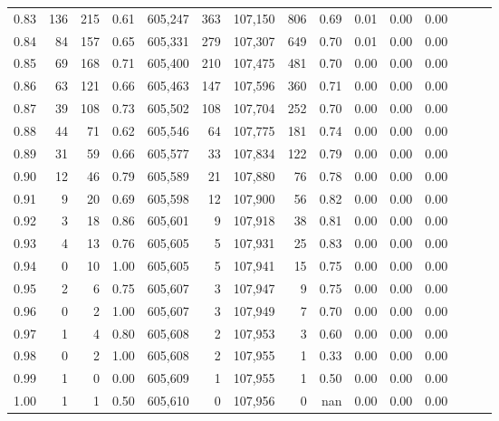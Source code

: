 \begin{tabular}{rrrrrrrrrrrrrrr}
0.83 &     136 &    215 &  0.61 &  605,247 &      363 &  107,150 &      806 &  0.69 &  0.01 &  0.00 &      0.00 \\
0.84 &      84 &    157 &  0.65 &  605,331 &      279 &  107,307 &      649 &  0.70 &  0.01 &  0.00 &      0.00 \\
0.85 &      69 &    168 &  0.71 &  605,400 &      210 &  107,475 &      481 &  0.70 &  0.00 &  0.00 &      0.00 \\
0.86 &      63 &    121 &  0.66 &  605,463 &      147 &  107,596 &      360 &  0.71 &  0.00 &  0.00 &      0.00 \\
0.87 &      39 &    108 &  0.73 &  605,502 &      108 &  107,704 &      252 &  0.70 &  0.00 &  0.00 &      0.00 \\
0.88 &      44 &     71 &  0.62 &  605,546 &       64 &  107,775 &      181 &  0.74 &  0.00 &  0.00 &      0.00 \\
0.89 &      31 &     59 &  0.66 &  605,577 &       33 &  107,834 &      122 &  0.79 &  0.00 &  0.00 &      0.00 \\
0.90 &      12 &     46 &  0.79 &  605,589 &       21 &  107,880 &       76 &  0.78 &  0.00 &  0.00 &      0.00 \\
0.91 &       9 &     20 &  0.69 &  605,598 &       12 &  107,900 &       56 &  0.82 &  0.00 &  0.00 &      0.00 \\
0.92 &       3 &     18 &  0.86 &  605,601 &        9 &  107,918 &       38 &  0.81 &  0.00 &  0.00 &      0.00 \\
0.93 &       4 &     13 &  0.76 &  605,605 &        5 &  107,931 &       25 &  0.83 &  0.00 &  0.00 &      0.00 \\
0.94 &       0 &     10 &  1.00 &  605,605 &        5 &  107,941 &       15 &  0.75 &  0.00 &  0.00 &      0.00 \\
0.95 &       2 &      6 &  0.75 &  605,607 &        3 &  107,947 &        9 &  0.75 &  0.00 &  0.00 &      0.00 \\
0.96 &       0 &      2 &  1.00 &  605,607 &        3 &  107,949 &        7 &  0.70 &  0.00 &  0.00 &      0.00 \\
0.97 &       1 &      4 &  0.80 &  605,608 &        2 &  107,953 &        3 &  0.60 &  0.00 &  0.00 &      0.00 \\
0.98 &       0 &      2 &  1.00 &  605,608 &        2 &  107,955 &        1 &  0.33 &  0.00 &  0.00 &      0.00 \\
0.99 &       1 &      0 &  0.00 &  605,609 &        1 &  107,955 &        1 &  0.50 &  0.00 &  0.00 &      0.00 \\
1.00 &       1 &      1 &  0.50 &  605,610 &        0 &  107,956 &        0 &   nan &  0.00 &  0.00 &      0.00 \\
\bottomrule
\end{tabular}
